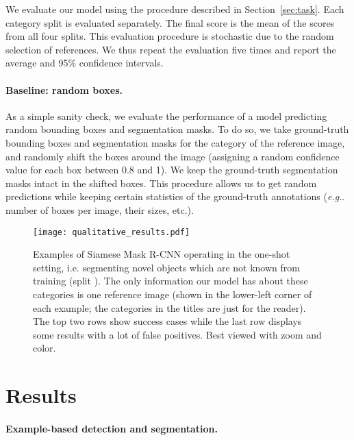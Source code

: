 \documentclass{article}
\makeatletter
\def\onedot{\ifx\let@token.\else.\null\fi\xspace}
\def\eg{\emph{e.g}\onedot} \def\Eg{\emph{E.g}\onedot}
\makeatother
\begin{document}
We evaluate our model using the procedure described in Section~\ref{sec:task}. Each category split is evaluated separately. The final score is the mean of the scores from all four splits. This evaluation procedure is stochastic due to the random selection of references. We thus repeat the evaluation five times and report the average and 95\% confidence intervals.

\paragraph{Baseline: random boxes.}
As a simple sanity check, we evaluate the performance of a model predicting random bounding boxes and segmentation masks. To do so, we take ground-truth bounding boxes and segmentation masks for the category of the reference image, and randomly shift the boxes around the image (assigning a random confidence value for each box between 0.8 and 1). We keep the ground-truth segmentation masks intact in the shifted boxes. This procedure allows us to get random predictions while keeping certain statistics of the ground-truth annotations (\eg number of boxes per image, their sizes, etc.).


\begin{figure*}[t]
    \begin{center}
    \texttt{[image: qualitative\_results.pdf]}
    \end{center}
    \vspace{-0.2cm}
    \caption{Examples of Siamese Mask R-CNN operating in the one-shot setting, i.e. segmenting novel objects which are not known from training (split ). The only information our model has about these categories is one reference image (shown in the lower-left corner of each example; the categories in the titles are just for the reader). The top two rows show success cases while the last row displays some results with a lot of false positives. Best viewed with zoom and color.}
\label{fig:visual_examples}
\end{figure*}



\section{Results}
\label{sec:results}

\paragraph{Example-based detection and segmentation.}
\end{document}
